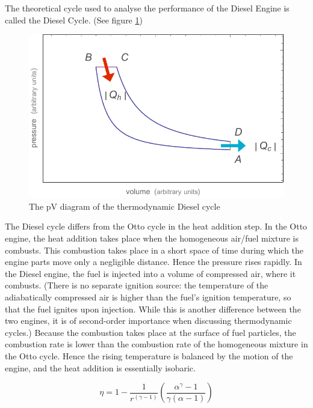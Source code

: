 The theoretical cycle used to analyse the performance of the Diesel Engine is
called the Diesel Cycle. (See figure \ref{fig:diesel-cycle})

\begin{figure}
\centering
\includegraphics[width=\textwidth]{Figures/diesel-cycle}
\decoRule
\caption[The Diesel cycle]{The pV diagram of the thermodynamic Diesel cycle}
\label{fig:diesel-cycle}
\end{figure}

The Diesel cycle differs from the Otto cycle in the heat addition step. In the
Otto engine, the heat addition takes place when the homogeneous air/fuel mixture
is combusts. This combustion takes place in a short space of time during which
the engine parts move only a negligible distance. Hence the pressure rises
rapidly. In the Diesel engine, the fuel is injected into a volume of compressed
air, where it combusts. (There is no separate ignition source: the temperature
of the adiabatically compressed air is higher than the fuel's ignition
temperature, so that the fuel ignites upon injection. While this is another
difference between the two engines, it is of second-order importance when
discussing thermodynamic cycles.) Because the combustion takes place at the
surface of fuel particles, the combustion rate is lower than the combustion rate
of the homogeneous mixture in the Otto cycle. Hence the rising temperature is
balanced by the motion of the engine, and the heat addition is essentially
isobaric.

\begin{equation}
	\eta = 1 - \frac{1}{r^{(\gamma - 1 )}}(\frac{\alpha^{\gamma}-1}{\gamma(\alpha-1)})
\label{eqn:diesel-efficiency}
\end{equation}
 
